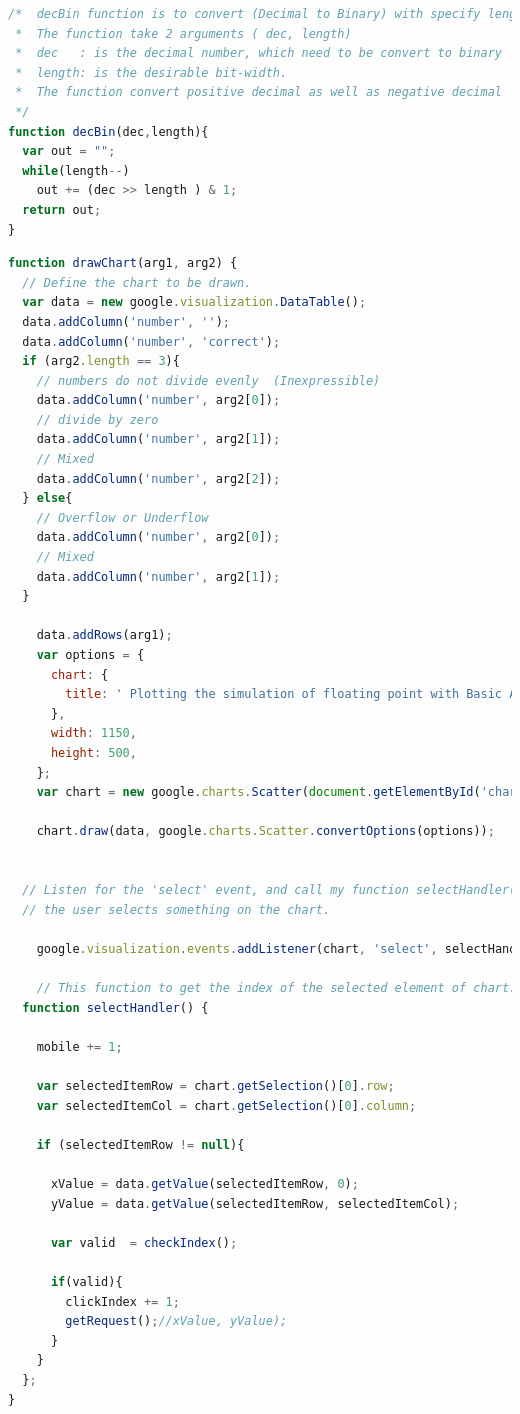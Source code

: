 \documentclass[11pt]{article}
\begin{document}
\begin{lstlisting}[label={lst:decBin}, language=Javascript, caption={Convert (Decimal to Binary) with specify length of the output},]
/*  decBin function is to convert (Decimal to Binary) with specify length of the output.
 *  The function take 2 arguments ( dec, length)
 *  dec   : is the decimal number, which need to be convert to binary
 *  length: is the desirable bit-width. 
 *  The function convert positive decimal as well as negative decimal 
 */
function decBin(dec,length){
  var out = "";
  while(length--)
    out += (dec >> length ) & 1;
  return out;
}
\end{lstlisting}

\begin{lstlisting}[label={lst:drawChart}, language=Javascript, caption={drawChart function will visualize the passed data to user.},]
function drawChart(arg1, arg2) {
  // Define the chart to be drawn. 
  var data = new google.visualization.DataTable();
  data.addColumn('number', '');
  data.addColumn('number', 'correct');
  if (arg2.length == 3){
    // numbers do not divide evenly  (Inexpressible) 
    data.addColumn('number', arg2[0]);
    // divide by zero
    data.addColumn('number', arg2[1]);
    // Mixed
    data.addColumn('number', arg2[2]);
  } else{
    // Overflow or Underflow
    data.addColumn('number', arg2[0]);
    // Mixed
    data.addColumn('number', arg2[1]);
  }
   
    data.addRows(arg1);
    var options = {
      chart: {
        title: ' Plotting the simulation of floating point with Basic Arithmetics'
      },
      width: 1150,
      height: 500,
    };
    var chart = new google.charts.Scatter(document.getElementById('chart_div1'));

    chart.draw(data, google.charts.Scatter.convertOptions(options));
 

  // Listen for the 'select' event, and call my function selectHandler() when
  // the user selects something on the chart.

    google.visualization.events.addListener(chart, 'select', selectHandler);

    // This function to get the index of the selected element of chart.
  function selectHandler() {

    mobile += 1;

    var selectedItemRow = chart.getSelection()[0].row;
    var selectedItemCol = chart.getSelection()[0].column;

    if (selectedItemRow != null){

      xValue = data.getValue(selectedItemRow, 0);
      yValue = data.getValue(selectedItemRow, selectedItemCol);

      var valid  = checkIndex();

      if(valid){
        clickIndex += 1;
        getRequest();//xValue, yValue);
      }
    }
  };
}
\end{lstlisting}
\end{document}
